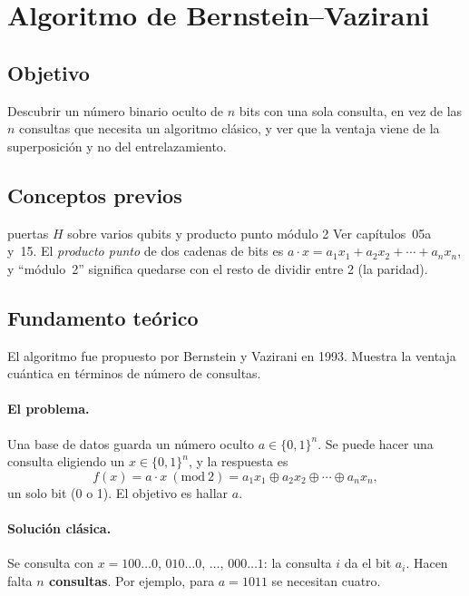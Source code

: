 \def\tituloconcepto{Algoritmo de Bernstein--Vazirani}


\section{Algoritmo de Bernstein--Vazirani}

\subsection{Objetivo}
Descubrir un número binario oculto de $n$ bits con una sola consulta, en vez de
las $n$ consultas que necesita un algoritmo clásico, y ver que la ventaja viene de
la superposición y no del entrelazamiento.

\subsection{Conceptos previos}
\begin{concepto}{puertas $H$ sobre varios qubits y producto punto módulo 2}
Ver capítulos~05a y~15. El \emph{producto punto} de dos cadenas de bits es
$a\cdot x=a_1x_1+a_2x_2+\cdots+a_nx_n$, y ``módulo~2'' significa quedarse con
el resto de dividir entre 2 (la paridad).
\end{concepto}

\subsection{Fundamento teórico}
El algoritmo fue propuesto por Bernstein y Vazirani en 1993. Muestra la
ventaja cuántica en términos de número de consultas.

\paragraph{El problema.} Una base de datos guarda un número oculto
$a\in\{0,1\}^n$. Se puede hacer una consulta eligiendo un $x\in\{0,1\}^n$, y la
respuesta es
\begin{equation}
  f(x)=a\cdot x\ (\mathrm{mod}\ 2)=a_1x_1\oplus a_2x_2\oplus\cdots\oplus a_nx_n,
\end{equation}
un solo bit (0 o 1). El objetivo es hallar $a$.

\paragraph{Solución clásica.} Se consulta con $x=100\ldots0$, $010\ldots0$,
$\ldots$, $000\ldots1$: la consulta $i$ da el bit $a_i$. Hacen falta \textbf{$n$
consultas}. Por ejemplo, para $a=1011$ se necesitan cuatro.

